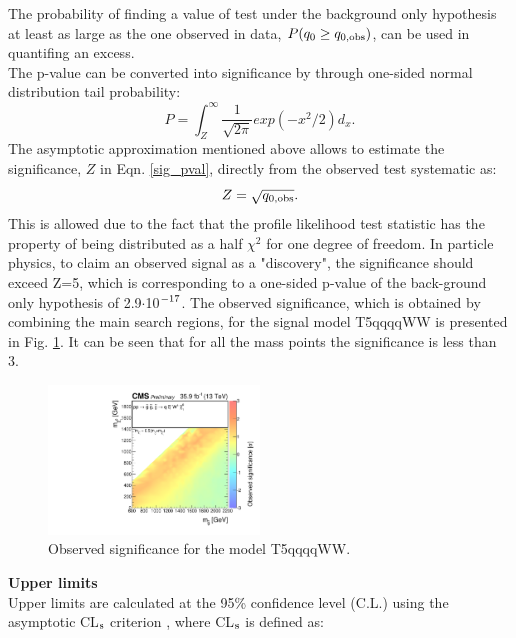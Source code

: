 The probability of finding a value of test 
 under the background only hypothesis at least as large as the one observed in data, $P(q_0\geq q_{0,\rm obs})$, can be used in quantifing an excess.\\
The p-value can be converted into significance by through one-sided normal distribution tail probability:
\begin{equation}
\label{sig_pval}
  P = \int_{Z}^{\infty} \frac{1}{\sqrt{2\pi}}exp(-x^2/2) d_x.
\end{equation}
The asymptotic approximation mentioned above allows to estimate the significance, $Z$ in Eqn. \ref{sig_pval}, directly from the observed test systematic as:
\begin{equation}
  {Z} = {\sqrt{q_{0,\rm obs}}}.
\end{equation}
This is allowed due to the fact that the profile likelihood test statistic has the property of being distributed as a half $\chi^2$ for one degree of freedom. In particle physics, to claim an observed signal as a "discovery", the significance should exceed Z=5, which is corresponding to a one-sided p-value of the back-ground only hypothesis of 2.9$\cdot$10$^{\rm -17}$. The observed significance, which is obtained by combining the main search regions,  for the signal model T5qqqqWW is presented in Fig. \ref{fig:obsig}. It can be seen that for all the mass points the significance is less than 3.\\
\begin{figure}
\begin{center}
\includegraphics[width=0.5\textwidth]{Plots/analysis/results/CMS-PAS-SUS-16-042_Figure-aux_002.pdf}
\caption{Observed significance for the model T5qqqqWW.}\label{fig:obsig}
\end{center}
\end{figure}
\textbf{Upper limits}\\
Upper limits are calculated at the 95\% confidence level (C.L.) using the asymptotic CL$_{\rm s}$ criterion \cite{Cls1}, where CL$_{\rm s}$ is defined as:
